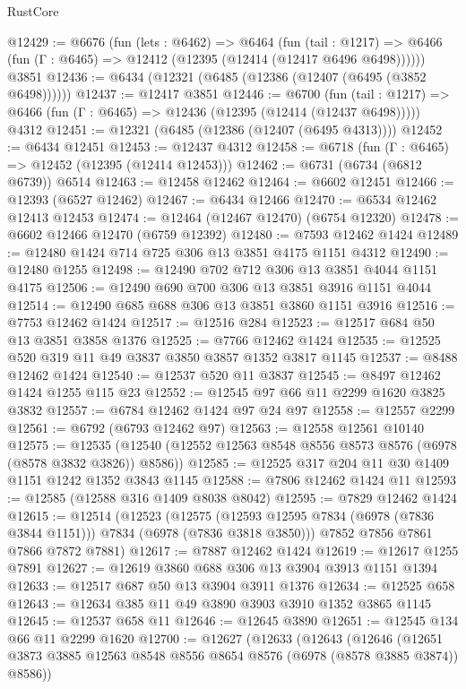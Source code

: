\begin{lexlean}{RustCore}
\begin{coremodule}
@12429 := @6676
    (fun (lets : @6462) =>
    @6464
      (fun (tail : @1217) =>
      @6466 (fun (Γ : @6465) => @12412 (@12395 (@12414 (@12417 @6496 @6498))))))
    @3851
@12436 := @6434 (@12321 (@6485 (@12386 (@12407 (@6495 (@3852 @6498))))))
@12437 := @12417 @3851
@12446 := @6700
    (fun (tail : @1217) => @6466 (fun (Γ : @6465) => @12436 (@12395 (@12414 (@12437 @6498)))))
    @4312
@12451 := @12321 (@6485 (@12386 (@12407 (@6495 @4313))))
@12452 := @6434 @12451
@12453 := @12437 @4312
@12458 := @6718 (fun (Γ : @6465) => @12452 (@12395 (@12414 @12453)))
@12462 := @6731 (@6734 (@6812 @6739)) @6514
@12463 := @12458 @12462
@12464 := @6602 @12451
@12466 := @12393 (@6527 @12462)
@12467 := @6434 @12466
@12470 := @6534 @12462 @12413 @12453
@12474 := @12464 (@12467 @12470) (@6754 @12320)
@12478 := @6602 @12466 @12470 (@6759 @12392)
@12480 := @7593 @12462 @1424
@12489 := @12480 @1424 @714 @725 @306 @13 @3851 @4175 @1151 @4312
@12490 := @12480 @1255
@12498 := @12490 @702 @712 @306 @13 @3851 @4044 @1151 @4175
@12506 := @12490 @690 @700 @306 @13 @3851 @3916 @1151 @4044
@12514 := @12490 @685 @688 @306 @13 @3851 @3860 @1151 @3916
@12516 := @7753 @12462 @1424
@12517 := @12516 @284
@12523 := @12517 @684 @50 @13 @3851 @3858 @1376
@12525 := @7766 @12462 @1424
@12535 := @12525 @520 @319 @11 @49 @3837 @3850 @3857 @1352 @3817 @1145
@12537 := @8488 @12462 @1424
@12540 := @12537 @520 @11 @3837
@12545 := @8497 @12462 @1424 @1255 @115 @23
@12552 := @12545 @97 @66 @11 @2299 @1620 @3825 @3832
@12557 := @6784 @12462 @1424 @97 @24 @97
@12558 := @12557 @2299
@12561 := @6792 (@6793 @12462 @97)
@12563 := @12558 @12561 @10140
@12575 := @12535 (@12540 (@12552 @12563 @8548 @8556 @8573 @8576 (@6978 (@8578 @3832 @3826)) @8586))
@12585 := @12525 @317 @204 @11 @30 @1409 @1151 @1242 @1352 @3843 @1145
@12588 := @7806 @12462 @1424 @11
@12593 := @12585 (@12588 @316 @1409 @8038 @8042)
@12595 := @7829 @12462 @1424
@12615 := @12514
    (@12523
      (@12575 (@12593 @12595 @7834 (@6978 (@7836 @3844 @1151))) @7834 (@6978 (@7836 @3818 @3850)))
      @7852
      @7856
      @7861
      @7866
      @7872
      @7881)
@12617 := @7887 @12462 @1424
@12619 := @12617 @1255 @7891
@12627 := @12619 @3860 @688 @306 @13 @3904 @3913 @1151 @1394
@12633 := @12517 @687 @50 @13 @3904 @3911 @1376
@12634 := @12525 @658
@12643 := @12634 @385 @11 @49 @3890 @3903 @3910 @1352 @3865 @1145
@12645 := @12537 @658 @11
@12646 := @12645 @3890
@12651 := @12545 @134 @66 @11 @2299 @1620
@12700 := @12627
    (@12633
      (@12643
        (@12646
          (@12651 @3873 @3885 @12563 @8548 @8556 @8654 @8576 (@6978 (@8578 @3885 @3874)) @8586))

\end{coremodule}
\end{lexlean}
